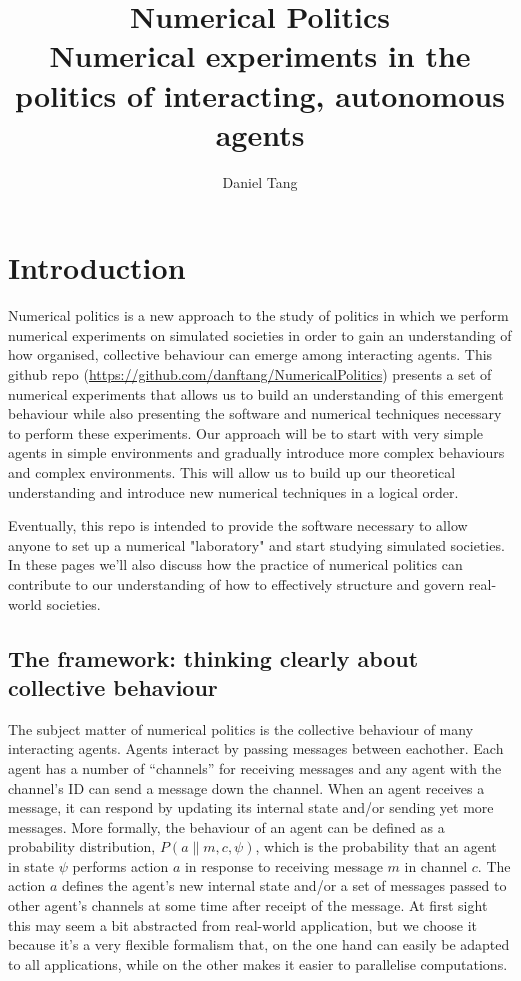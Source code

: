 \documentclass[a4paper]{report}
\title{Numerical Politics\\
	\large Numerical experiments in the politics of interacting, autonomous agents}
\author{Daniel Tang}
\begin{document}
\maketitle
\tableofcontents

\chapter{Introduction}

Numerical politics is a new approach to the study of politics in which we perform numerical experiments on simulated societies in order to gain an understanding of how organised, collective behaviour can emerge among interacting agents. This github repo (\url{https://github.com/danftang/NumericalPolitics}) presents a set of numerical experiments  that allows us to build an understanding of this emergent behaviour while also presenting the software and numerical techniques necessary to perform these experiments. Our approach will be to start with very simple agents in simple environments and gradually introduce more complex behaviours and complex environments. This will allow us to build up our theoretical understanding and introduce new numerical techniques in a logical order.

Eventually, this repo is intended to provide the software necessary to allow anyone to set up a numerical "laboratory" and start studying simulated societies. In these pages we'll also discuss how the practice of numerical politics can contribute to our understanding of how to effectively structure and govern real-world societies.

\section{The framework: thinking clearly about collective behaviour}

The subject matter of numerical politics is the collective behaviour of many interacting agents. Agents interact by passing messages between eachother. Each agent has a number of ``channels'' for receiving messages and any agent with the channel's ID can send a message down the channel. When an agent receives a message, it can respond by updating its internal state and/or sending yet more messages. More formally, the behaviour of an agent can be defined as a probability distribution, $P(a\|m,c,\psi)$, which is the probability that an agent in state $\psi$ performs action $a$ in response to receiving message $m$ in channel $c$. The action $a$ defines the agent's new internal state and/or a set of messages passed to other agent's channels at some time after receipt of the message. At first sight this may seem a bit abstracted from real-world application, but we choose it because it's a very flexible formalism that, on the one hand can easily be adapted to all applications, while on the other makes it easier to parallelise computations.
\end{document}

